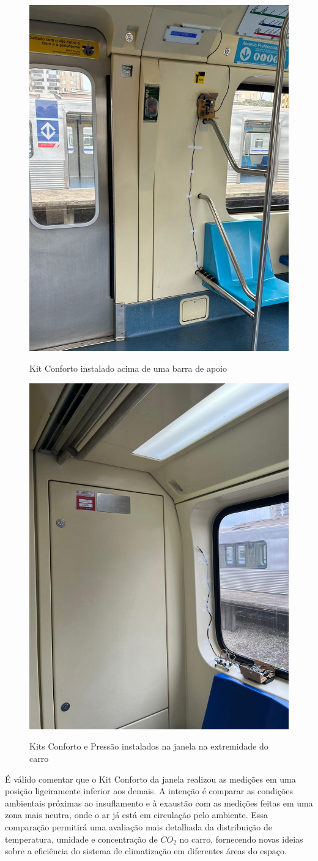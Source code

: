 \documentclass[acronym,symbols,table]{fei}
\begin{document}
\begin{figure}[!htb]
\centering
    \caption{Kit Conforto instalado acima de uma barra de apoio}
    \includegraphics[width=0.39\linewidth]{Imagens/kitporta.jpeg}
    \label{fig:kitporta}
\end{figure}

\newpage

\begin{figure}[!htb]
\centering
    \caption{Kits Conforto e Pressão instalados na janela na extremidade do carro}
    \includegraphics[width=0.4\linewidth]{Imagens/kitjanela.jpeg}
    \label{fig:kitjanela}
\end{figure}


É válido comentar que o Kit Conforto da janela realizou as medições em uma posição ligeiramente inferior aos demais. A intenção é comparar as condições ambientais próximas ao insuflamento e à exaustão com as medições feitas em uma zona mais neutra, onde o ar já está em circulação pelo ambiente. Essa comparação permitirá uma avaliação mais detalhada da distribuição de temperatura, umidade e concentração de ${CO}_{2}$ no carro, fornecendo novas ideias sobre a eficiência do sistema de climatização em diferentes áreas do espaço.
\end{document}
